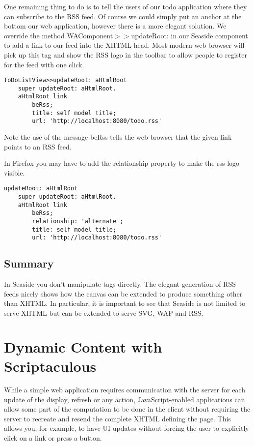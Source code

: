 \documentclass[a4paper,10pt,twoside]{book}
\newcommand{\ct}[1]{{\small\ttfamily\textup{#1}}}
\begin{document}
One remaining thing to do is to tell the users of our todo application where they can subscribe to the RSS feed. Of course we could simply put an anchor at the bottom our web application, however there is a more elegant solution. We override the method  \ct{WAComponent$>$$>$updateRoot:} in our Seaside component to add a link to our feed into the XHTML head. Most modern web browser will pick up this tag and show the RSS logo in the toolbar to allow people to register for the feed with one click.

\begin{lstlisting}
ToDoListView>>updateRoot: aHtmlRoot
    super updateRoot: aHtmlRoot.
    aHtmlRoot link
        beRss;
        title: self model title;
        url: 'http://localhost:8080/todo.rss'
\end{lstlisting}

Note the use of the message \ct{beRss} tells the web browser that the given link points to an RSS feed.

In Firefox you may have to add the relationship property to make the rss logo visible.
 

\begin{lstlisting}
updateRoot: aHtmlRoot
    super updateRoot: aHtmlRoot.
    aHtmlRoot link
        beRss;
        relationship: 'alternate';
        title: self model title;
        url: 'http://localhost:8080/todo.rss'
\end{lstlisting}

\section{Summary}
\label{book:web20:rss:summary}

In Seaside you don't manipulate tags directly. The elegant generation of RSS feeds nicely shows how the canvas can be extended to produce something other than XHTML. In particular, it is important to see that Seaside is not limited to serve XHTML but can be extended to serve SVG, WAP and RSS.

\chapter{Dynamic Content with Scriptaculous}
\label{book:web20:scriptaculous}

While a simple web application requires communication with the server for each update of the display, refresh or any action, JavaScript-enabled applications can allow some part of the computation to be done in the client without requiring the server to recreate and resend the complete XHTML defining the page. This allows you, for example, to have UI updates without forcing the user to explicitly click on a link or press a button.
\end{document}
